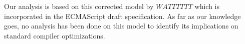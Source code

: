 
  
   
   Our analysis is based on this corrected model by $WATTTTTT$ which is incorporated in the ECMAScript draft specification. As far as our knowledge goes, no analysis has been done on this model to identify its implications on standard compiler optimizations. 